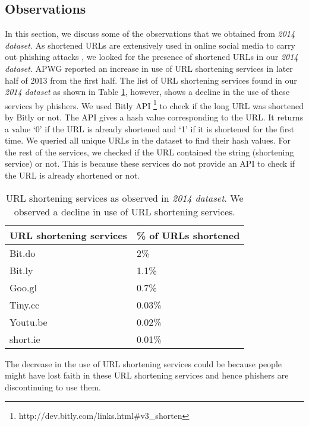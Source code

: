 \documentclass[conference]{IEEEtran}
\begin{document}
\subsection{Observations}
In this section, we discuss some of the observations that we obtained from \textit{2014 dataset}. As shortened URLs are extensively used in online social media to carry out phishing attacks \cite{chhabra}, we looked for the presence of shortened URLs in our \textit{2014 dataset}. APWG reported an increase in use of URL shortening services in later half of 2013 from the first half. The list of URL shortening services found in our \textit{2014 dataset} as shown in Table \ref{tab:url-shortener}, however, shows a decline in the use of these services by phishers. We used Bitly API \footnote{http://dev.bitly.com/links.html\#v3\_shorten} to check if the long URL was shortened by Bitly or not. The API gives a hash value corresponding to the URL. It returns a value `0' if the URL is already shortened and `1' if it is shortened for the first time. We queried all unique URLs in the dataset to find their hash values. For the rest of the services, we checked if the URL contained the string (shortening service) or not. This is because these services do not provide an API to check if the URL is already shortened or not.
\begin{table}[h]
\centering
\caption{URL shortening services as observed in \textit{2014 dataset}. We observed a decline in use of URL shortening services.}
\label{tab:url-shortener}
\begin{small}
\begin{tabular}{|p{2cm}|p{1.5cm}|} \hline
\small URL shortening services &\small \% of URLs shortened \\ \hline
Bit.do & 2\%\\ \hline
Bit.ly & 1.1\%\\ \hline
Goo.gl & 0.7\%\\ \hline
Tiny.cc & 0.03\% \\ \hline
Youtu.be & 0.02\% \\ \hline
short.ie & 0.01\% \\ \hline
\end{tabular}
\end{small}
\end{table}
\newline
The decrease in the use of URL shortening services could be because people might have lost faith in these URL shortening services and hence phishers are discontinuing to use them.
\newline\indent
\end{document}
